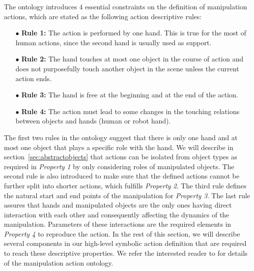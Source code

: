 The ontology introduces $4$ essential constraints on the definition of manipulation actions, which are stated as the following action descriptive rules: 


\begin{itemize}
 \item[$\bullet$] \textbf{Rule 1:} The action is performed by one hand. This is true for the most of human actions, since the second hand is usually used as support.
 \item[$\bullet$] \textbf{Rule 2:} The hand touches at most one object in the course of action and does not purposefully touch another object in the scene unless the current action ends.
 \item[$\bullet$] \textbf{Rule 3:} The hand is free at the beginning and at the end of the action.
 \item[$\bullet$] \textbf{Rule 4:} The action must lead to some changes in the touching relations between objects and hands (\eg human or robot hand).
\end{itemize}



The first two rules in the ontology suggest that there is only one hand and at most one object that plays a specific role with the hand. We will describe in section~\ref{sec:abstractobjects} that actions can be isolated from object types  as required in {\it Property 1} by only considering roles of manipulated objects. The second rule is also introduced to make sure that the defined actions cannot be further split into shorter actions, which fulfills {\it Property 2}. The third  rule defines the natural start and end points of the manipulation for {\it Property 3}. The last rule assures that hands and manipulated objects are the only ones having direct interaction with each other and consequently affecting the dynamics of the manipulation. Parameters of these interactions are the required elements in {\it Property 4} to reproduce the action. In the rest of this section, we will describe several components in our high-level symbolic action definition that are required to reach these descriptive properties.
We refer the interested reader to \cite{TAMD13} for details of the manipulation action ontology. 


